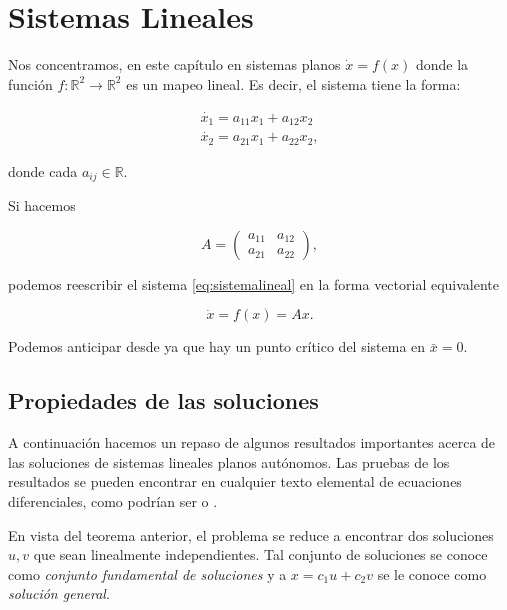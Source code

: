 \documentclass[11pt]{book}
\theoremstyle{definition}
\numberwithin{definition}{section}
\theoremstyle{theorem}
\numberwithin{theorem}{section}
\numberwithin{lemma}{section}
\numberwithin{corollary}{section}
\theoremstyle{plain}
\numberwithin{example}{section}
\newcommand{\R}{{\ensuremath{\mathbb{R}}}}
\begin{document}
\chapter{Sistemas Lineales}

Nos concentramos, en este capítulo en sistemas planos $\dot{x} = f(x)$ donde la función $f: \R^2 \to \R^2$ es un mapeo lineal. Es decir, el sistema tiene la forma:

\begin{equation} \label{eq:sistemalineal}
	\begin{array}{l}
		\dot{x_1} = a_{11}x_1 + a_{12}x_2 \\
		\dot{x_2} = a_{21}x_1 + a_{22}x_2,
	\end{array}
\end{equation}

donde cada $a_{ij} \in \R$.

Si hacemos

$$ A = \left(
\begin{array}{ll}
	a_{11} & a_{12} \\
	a_{21} & a_{22}
\end{array}
\right),
$$

podemos reescribir el sistema \ref{eq:sistemalineal} en la forma vectorial equivalente

\begin{equation} \label{eq:sistemalinealv}
	\dot{x} = f(x) = Ax.
\end{equation}

Podemos anticipar desde ya que hay un punto crítico del sistema en $\bar{x} = 0$.

\section{Propiedades de las soluciones}

A continuación hacemos un repaso de algunos resultados importantes acerca de las soluciones de sistemas lineales planos autónomos. Las pruebas de los resultados se pueden encontrar en cualquier texto elemental de ecuaciones diferenciales, como podrían ser \cite{zillcull} o \cite{boycediprima}.


En vista del teorema anterior, el problema se reduce a encontrar dos soluciones $u, v$ que sean linealmente independientes. Tal conjunto de soluciones se conoce como \emph{conjunto fundamental de soluciones} y a $x = c_1u + c_2v$ se le conoce como \textit{solución general}.
\end{document}
